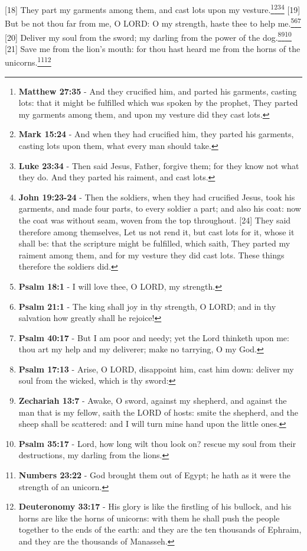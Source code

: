 [18] \textcolor[cmyk]{0.99998,1,0,0}{They part my garments among them, and cast lots upon my vesture.}\footnote{\textbf{Matthew 27:35} - And they crucified him, and parted his garments, casting lots: that it might be fulfilled which was spoken by the prophet, They parted my garments among them, and upon my vesture did they cast lots.}\footnote{\textbf{Mark 15:24} - And when they had crucified him, they parted his garments, casting lots upon them, what every man should take.}\footnote{\textbf{Luke 23:34} - Then said Jesus, Father, forgive them; for they know not what they do. And they parted his raiment, and cast lots.}\footnote{\textbf{John 19:23-24} - Then the soldiers, when they had crucified Jesus, took his garments, and made four parts, to every soldier a part; and also his coat: now the coat was without seam, woven from the top throughout. [24] They said therefore among themselves, Let us not rend it, but cast lots for it, whose it shall be: that the scripture might be fulfilled, which saith, They parted my raiment among them, and for my vesture they did cast lots. These things therefore the soldiers did.}
[19] \textcolor[cmyk]{0.99998,1,0,0}{But be not thou far from me, O LORD: O my strength, haste thee to help me.}\footnote{\textbf{Psalm 18:1} - I will love thee, O LORD, my strength.}\footnote{\textbf{Psalm 21:1} - The king shall joy in thy strength, O LORD; and in thy salvation how greatly shall he rejoice!}\footnote{\textbf{Psalm 40:17} - But I am poor and needy; yet the Lord thinketh upon me: thou art my help and my deliverer; make no tarrying, O my God.}
[20] \textcolor[cmyk]{0.99998,1,0,0}{Deliver my soul from the sword; my darling from the power of the dog.}\footnote{\textbf{Psalm 17:13} - Arise, O LORD, disappoint him, cast him down: deliver my soul from the wicked, which is thy sword:}\footnote{\textbf{Zechariah 13:7} - Awake, O sword, against my shepherd, and against the man that is my fellow, saith the LORD of hosts: smite the shepherd, and the sheep shall be scattered: and I will turn mine hand upon the little ones.}\footnote{\textbf{Psalm 35:17} - Lord, how long wilt thou look on? rescue my soul from their destructions, my darling from the lions.}
[21] \textcolor[cmyk]{0.99998,1,0,0}{Save me from the lion's mouth: for thou hast heard me from the horns of the unicorns.}\footnote{\textbf{Numbers 23:22} - God brought them out of Egypt; he hath as it were the strength of an unicorn.}\footnote{\textbf{Deuteronomy 33:17} - His glory is like the firstling of his bullock, and his horns are like the horns of unicorns: with them he shall push the people together to the ends of the earth: and they are the ten thousands of Ephraim, and they are the thousands of Manasseh.}
